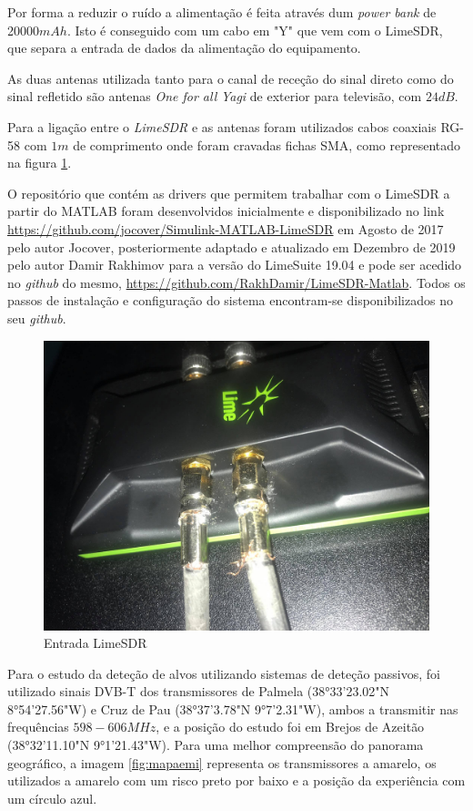 Por forma a reduzir o ruído a alimentação é feita através dum \textit{power bank} de 20000$mAh$. Isto é conseguido com um cabo em "Y" que vem com o LimeSDR, que separa a entrada de dados da alimentação do equipamento.\par 
As duas antenas utilizada tanto para o canal de receção do sinal direto como do sinal refletido são antenas \textit{One for all} \textit{Yagi} de exterior para televisão, com $24dB$.\par 
Para a ligação entre o \textit{LimeSDR} e as antenas foram utilizados cabos coaxiais RG-58 com $1m$ de comprimento onde foram cravadas fichas SMA, como representado na figura \ref{fig:limec}.\par 
O repositório que contém as drivers que permitem trabalhar com o LimeSDR a partir do MATLAB foram desenvolvidos inicialmente e disponibilizado no link \url{https://github.com/jocover/Simulink-MATLAB-LimeSDR} em Agosto de 2017 pelo autor Jocover, posteriormente adaptado e atualizado em Dezembro de 2019 pelo autor Damir Rakhimov para a versão do LimeSuite 19.04 e pode ser acedido no \textit{github} do mesmo, \url{https://github.com/RakhDamir/LimeSDR-Matlab}. Todos os passos de instalação e configuração do sistema encontram-se disponibilizados no seu \textit{github}.

\begin{figure}[h]
\centering
\includegraphics[scale=0.15]{chapters/ch5/assets/limec}
\caption[Entrada LimeSDR]{Entrada LimeSDR}
\label{fig:limec}
\end{figure}

Para o estudo da deteção de alvos utilizando sistemas de deteção passivos, foi utilizado sinais \gls{DVB-T} dos transmissores de Palmela (38°33'23.02"N	8°54'27.56"W) e Cruz de Pau (38°37'3.78"N	9°7'2.31"W), ambos a transmitir nas frequências $598-606 MHz$, e a posição do estudo foi em Brejos de Azeitão (38°32'11.10"N	9°1'21.43"W). Para uma melhor compreensão do panorama geográfico, a imagem \ref{fig:mapaemi} representa os transmissores a amarelo,  os utilizados a amarelo com um risco preto por baixo e a posição da experiência com um círculo azul.\par 

